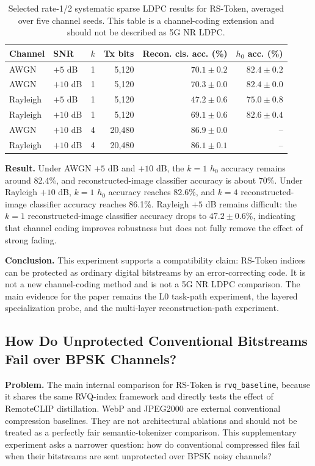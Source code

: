 \documentclass[lettersize,journal]{IEEEtran}
\begin{document}
\begin{table}[!t]
\centering
\caption{Selected rate-1/2 systematic sparse LDPC results for RS-Token, averaged over five channel seeds. This table is a channel-coding extension and should not be described as 5G NR LDPC.}
\label{tab:ldpc_rstoken}
\begin{tabular}{@{}llrrrr@{}}
\toprule
Channel & SNR & $k$ & Tx bits & Recon. cls. acc. (\%) & $h_0$ acc. (\%) \\
\midrule
AWGN & $+5$ dB & 1 & 5{,}120 & $70.1\pm0.2$ & $82.4\pm0.2$ \\
AWGN & $+10$ dB & 1 & 5{,}120 & $70.3\pm0.0$ & $82.4\pm0.0$ \\
Rayleigh & $+5$ dB & 1 & 5{,}120 & $47.2\pm0.6$ & $75.0\pm0.8$ \\
Rayleigh & $+10$ dB & 1 & 5{,}120 & $69.1\pm0.6$ & $82.6\pm0.4$ \\
AWGN & $+10$ dB & 4 & 20{,}480 & $86.9\pm0.0$ & -- \\
Rayleigh & $+10$ dB & 4 & 20{,}480 & $86.1\pm0.1$ & -- \\
\bottomrule
\end{tabular}
\end{table}

\textbf{Result.} Under AWGN $+5$ dB and $+10$ dB, the $k=1$ $h_0$ accuracy remains around 82.4\%, and reconstructed-image classifier accuracy is about 70\%. Under Rayleigh $+10$ dB, $k=1$ $h_0$ accuracy reaches 82.6\%, and $k=4$ reconstructed-image classifier accuracy reaches 86.1\%. Rayleigh $+5$ dB remains difficult: the $k=1$ reconstructed-image classifier accuracy drops to $47.2\pm0.6\%$, indicating that channel coding improves robustness but does not fully remove the effect of strong fading.

\textbf{Conclusion.} This experiment supports a compatibility claim: RS-Token indices can be protected as ordinary digital bitstreams by an error-correcting code. It is not a new channel-coding method and is not a 5G NR LDPC comparison. The main evidence for the paper remains the L0 task-path experiment, the layered specialization probe, and the multi-layer reconstruction-path experiment.

\subsection{How Do Unprotected Conventional Bitstreams Fail over BPSK Channels?}
\textbf{Problem.} The main internal comparison for RS-Token is \texttt{rvq\_baseline}, because it shares the same RVQ-index framework and directly tests the effect of RemoteCLIP distillation. WebP and JPEG2000 are external conventional compression baselines. They are not architectural ablations and should not be treated as a perfectly fair semantic-tokenizer comparison. This supplementary experiment asks a narrower question: how do conventional compressed files fail when their bitstreams are sent unprotected over BPSK noisy channels?
\end{document}
